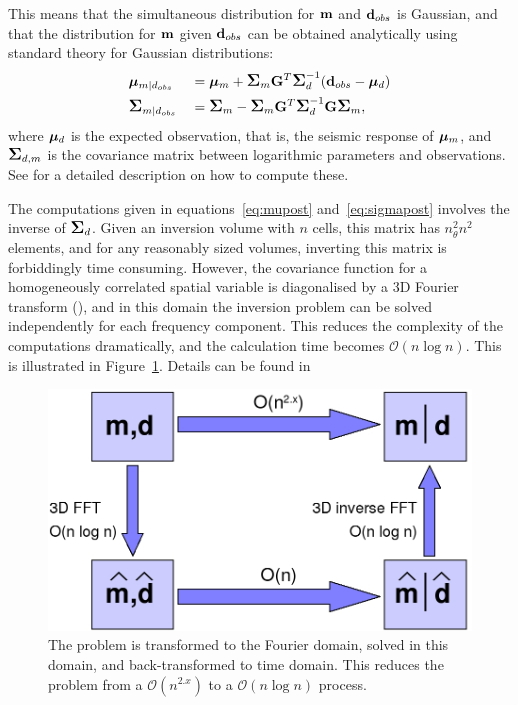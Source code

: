 This means that the simultaneous distribution for $\mathbf{m}$ and
$\mathbf{d}_{obs}$ is Gaussian, and that the distribution for $\mathbf{m}$
given $\mathbf{d}_{obs}$ can be obtained analytically using standard
theory for Gaussian distributions:
%
\begin{alignat}{2}
  &\bm\mu_{m|d_{obs}}    &&=\bm\mu_{m} +\mbox{\large\ensuremath{\boldsymbol{\Sigma}}}_{m}\mathbf{G}^T \mbox{\large\ensuremath{\boldsymbol{\Sigma}}}_{d}^{-1}
                           (\mathbf{d}_{obs}-\bm\mu_{d})     \label{eq:mupost} \\
  &\mbox{\large\ensuremath{\boldsymbol{\Sigma}}}_{m|d_{obs}} &&=\mbox{\large\ensuremath{\boldsymbol{\Sigma}}}_{m} - \mbox{\large\ensuremath{\boldsymbol{\Sigma}}}_{m}\mathbf{G}^T
                           \mbox{\large\ensuremath{\boldsymbol{\Sigma}}}_{d}^{-1}\mathbf{G}\mbox{\large\ensuremath{\boldsymbol{\Sigma}}}_{m},\label{eq:sigmapost}
\end{alignat}
%
where $\bm\mu_{d}$ is the expected observation, that is, the
seismic response of $\bm\mu_m$, and $\mbox{\large\ensuremath{\boldsymbol{\Sigma}}}_{d,m}$ is the
covariance matrix between logarithmic parameters and
observations. See \cite{geo68ab1} for a detailed description on
how to compute these.

The computations given in equations~\eqref{eq:mupost}
and~\eqref{eq:sigmapost} involves the inverse of $\mbox{\large\ensuremath{\boldsymbol{\Sigma}}}_{d}$. Given an
inversion volume with $n$ cells, this matrix has $n_\theta^2n^2$
elements, and for any reasonably sized volumes, inverting this matrix
is forbiddingly time consuming. However, the covariance function for a
homogeneously correlated spatial variable is diagonalised by a 3D
Fourier transform (\cite{christakos92}), and in this domain the inversion
problem can be solved independently for each frequency component. This
reduces the complexity of the computations dramatically, and the
calculation time becomes $\mathcal{O}(n\log n)$. This is illustrated
in Figure~\ref{fig:FFT-flowdiagram}. Details can be found in
\cite{geo68ab2}
\begin{figure}[H]
  \includegraphics[width=.99\linewidth]{images/FFT_flowdiagram}
  \caption{The problem is transformed to the Fourier domain, solved
  in this domain, and back-transformed to time domain. This reduces
  the problem from a $\mathcal{O}(n^{2.x})$ to a $\mathcal{O}(n\log
  n)$ process.}
  \label{fig:FFT-flowdiagram}
\end{figure}


